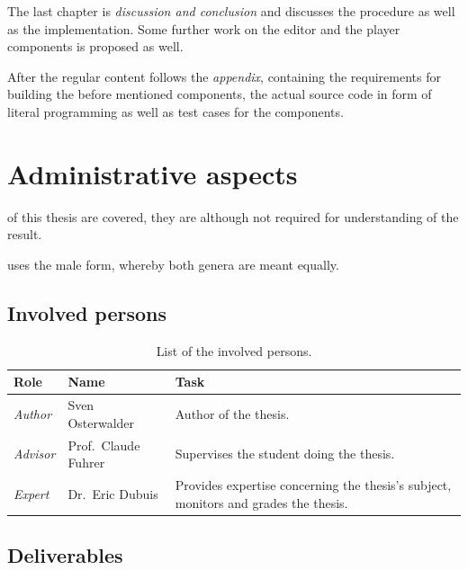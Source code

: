\documentclass[%
    a4paper,
    nobib,   %
    openany  %
]{tufte-book}
\begin{document}
The last chapter is \textit{discussion and conclusion} and discusses the
procedure as well as the implementation. Some further work on the editor and the
player components is proposed as well.

After the regular content follows the \textit{appendix}, containing the
requirements for building the before mentioned components, the actual source
code in form of literal programming as well as test cases for the components.

\chapter{Administrative aspects}
\label{chap:administrative_aspects}

 of this thesis are covered, they are
although not required for understanding of the result.

 uses the male form, whereby both genera are
meant equally.

\section{Involved persons}
\label{sec:involved_persons}

\begin{table}[h]
  \caption{List of the involved persons.}
  \begin{tabularx}{\textwidth}{llX}
    \toprule
    \textbf{Role} & \textbf{Name} & \textbf{Task} \\
    \midrule
    \textit{Author}  & Sven Osterwalder\protect\footnotemark[1]{} & Author of the thesis.\\
    \textit{Advisor} & Prof.\ Claude Fuhrer\protect\footnotemark[2]{} & Supervises the student doing the thesis.\\
    \textit{Expert}  & Dr.\ Eric Dubuis\protect\footnotemark[3]{}     & Provides expertise concerning the thesis's subject, monitors and grades the thesis.\\
    \bottomrule
  \end{tabularx}
\end{table}

\section{Deliverables}
\label{sec:deliverables}
\end{document}
